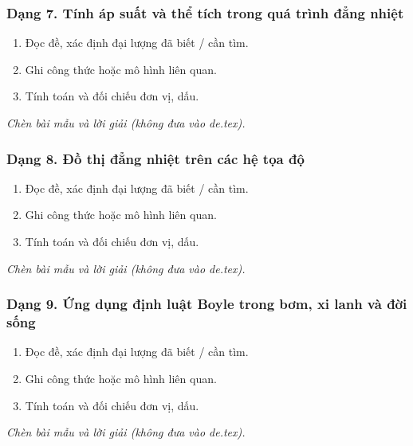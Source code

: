 \subsubsection{Dạng 7. Tính áp suất và thể tích trong quá trình đẳng nhiệt}
\begin{phuongphap}
\begin{enumerate}
\item Đọc đề, xác định đại lượng đã biết / cần tìm.
\item Ghi công thức hoặc mô hình liên quan.
\item Tính toán và đối chiếu đơn vị, dấu.
\end{enumerate}
\end{phuongphap}
\begin{vidumau}
\textit{Chèn bài mẫu và lời giải (không đưa vào de.tex).}
\end{vidumau}

\subsubsection{Dạng 8. Đồ thị đẳng nhiệt trên các hệ tọa độ}
\begin{phuongphap}
\begin{enumerate}
\item Đọc đề, xác định đại lượng đã biết / cần tìm.
\item Ghi công thức hoặc mô hình liên quan.
\item Tính toán và đối chiếu đơn vị, dấu.
\end{enumerate}
\end{phuongphap}
\begin{vidumau}
\textit{Chèn bài mẫu và lời giải (không đưa vào de.tex).}
\end{vidumau}

\subsubsection{Dạng 9. Ứng dụng định luật Boyle trong bơm, xi lanh và đời sống}
\begin{phuongphap}
\begin{enumerate}
\item Đọc đề, xác định đại lượng đã biết / cần tìm.
\item Ghi công thức hoặc mô hình liên quan.
\item Tính toán và đối chiếu đơn vị, dấu.
\end{enumerate}
\end{phuongphap}
\begin{vidumau}
\textit{Chèn bài mẫu và lời giải (không đưa vào de.tex).}
\end{vidumau}

